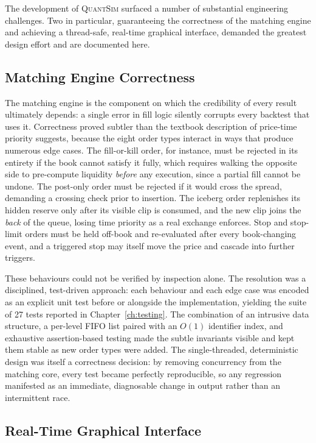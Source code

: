 \documentclass[12pt,oneside,a4paper]{report}
\newcommand{\quantsim}{\textsc{QuantSim}}
\begin{document}
The development of \quantsim{} surfaced a number of substantial engineering challenges. Two in particular, guaranteeing the correctness of the matching engine and achieving a thread-safe, real-time graphical interface, demanded the greatest design effort and are documented here.

\subsection{Matching Engine Correctness}

The matching engine is the component on which the credibility of every result ultimately depends: a single error in fill logic silently corrupts every backtest that uses it. Correctness proved subtler than the textbook description of price-time priority suggests, because the eight order types interact in ways that produce numerous edge cases. The fill-or-kill order, for instance, must be rejected in its entirety if the book cannot satisfy it fully, which requires walking the opposite side to pre-compute liquidity \emph{before} any execution, since a partial fill cannot be undone. The post-only order must be rejected if it would cross the spread, demanding a crossing check prior to insertion. The iceberg order replenishes its hidden reserve only after its visible clip is consumed, and the new clip joins the \emph{back} of the queue, losing time priority as a real exchange enforces. Stop and stop-limit orders must be held off-book and re-evaluated after every book-changing event, and a triggered stop may itself move the price and cascade into further triggers.

These behaviours could not be verified by inspection alone. The resolution was a disciplined, test-driven approach: each behaviour and each edge case was encoded as an explicit unit test before or alongside the implementation, yielding the suite of 27 tests reported in Chapter~\ref{ch:testing}. The combination of an intrusive data structure, a per-level FIFO list paired with an $O(1)$ identifier index, and exhaustive assertion-based testing made the subtle invariants visible and kept them stable as new order types were added. The single-threaded, deterministic design was itself a correctness decision: by removing concurrency from the matching core, every test became perfectly reproducible, so any regression manifested as an immediate, diagnosable change in output rather than an intermittent race.

\subsection{Real-Time Graphical Interface}
\end{document}
